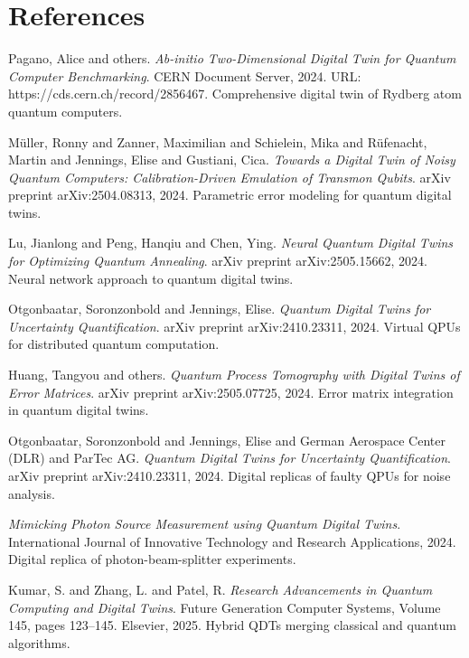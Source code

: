 \documentclass[12pt,a4paper]{article}
\begin{document}
\newpage
\section{References}

\begin{thebibliography}{99}

Pagano, Alice and others.
\textit{Ab-initio Two-Dimensional Digital Twin for Quantum Computer Benchmarking}.
CERN Document Server, 2024.
URL: https://cds.cern.ch/record/2856467.
Comprehensive digital twin of Rydberg atom quantum computers.

Müller, Ronny and Zanner, Maximilian and Schielein, Mika and Rüfenacht, Martin and Jennings, Elise and Gustiani, Cica.
\textit{Towards a Digital Twin of Noisy Quantum Computers: Calibration-Driven Emulation of Transmon Qubits}.
arXiv preprint arXiv:2504.08313, 2024.
Parametric error modeling for quantum digital twins.

Lu, Jianlong and Peng, Hanqiu and Chen, Ying.
\textit{Neural Quantum Digital Twins for Optimizing Quantum Annealing}.
arXiv preprint arXiv:2505.15662, 2024.
Neural network approach to quantum digital twins.

Otgonbaatar, Soronzonbold and Jennings, Elise.
\textit{Quantum Digital Twins for Uncertainty Quantification}.
arXiv preprint arXiv:2410.23311, 2024.
Virtual QPUs for distributed quantum computation.

Huang, Tangyou and others.
\textit{Quantum Process Tomography with Digital Twins of Error Matrices}.
arXiv preprint arXiv:2505.07725, 2024.
Error matrix integration in quantum digital twins.

Otgonbaatar, Soronzonbold and Jennings, Elise and German Aerospace Center (DLR) and ParTec AG.
\textit{Quantum Digital Twins for Uncertainty Quantification}.
arXiv preprint arXiv:2410.23311, 2024.
Digital replicas of faulty QPUs for noise analysis.

\textit{Mimicking Photon Source Measurement using Quantum Digital Twins}.
International Journal of Innovative Technology and Research Applications, 2024.
Digital replica of photon-beam-splitter experiments.

Kumar, S. and Zhang, L. and Patel, R.
\textit{Research Advancements in Quantum Computing and Digital Twins}.
Future Generation Computer Systems, Volume 145, pages 123--145. Elsevier, 2025.
Hybrid QDTs merging classical and quantum algorithms.


\end{thebibliography}
\end{document}
